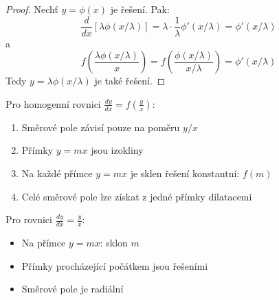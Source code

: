 \vspace{0.4\baselineskip}

\begin{proof}
Nechť $y = \phi(x)$ je řešení. Pak:
\[
\frac{d}{dx}[\lambda\phi(x/\lambda)] = \lambda\cdot\frac{1}{\lambda}\phi'(x/\lambda) = \phi'(x/\lambda)
\]
a
\[
f\left(\frac{\lambda\phi(x/\lambda)}{x}\right) = f\left(\frac{\phi(x/\lambda)}{x/\lambda}\right) = \phi'(x/\lambda)
\]
Tedy $y = \lambda\phi(x/\lambda)$ je také řešení.
\end{proof}

\vspace{0.6\baselineskip}

\begin{method}
\label{met:smerove-pole-homogenni}
Pro homogenní rovnici $\frac{dy}{dx} = f\left(\frac{y}{x}\right)$:
\begin{enumerate}
\item Směrové pole závisí pouze na poměru $y/x$
\item Přímky $y = mx$ jsou izokliny
\item Na každé přímce $y = mx$ je sklen řešení konstantní: $f(m)$
\item Celé směrové pole lze získat z jedné přímky dilatacemi
\end{enumerate}
\end{method}

\vspace{0.6\baselineskip}

\begin{example}[Směrové pole pro $\frac{dy}{dx} = \frac{y}{x}$]
\label{ex:smerove-pole-zaklad}
Pro rovnici $\frac{dy}{dx} = \frac{y}{x}$:
\begin{itemize}
\item Na přímce $y = mx$: sklon $m$
\item Přímky procházející počátkem jsou řešeními
\item Směrové pole je radiální
\end{itemize}
\end{example}

\vspace{0.6\baselineskip}

